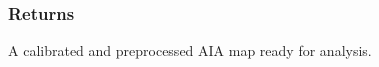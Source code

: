 \documentclass[letterpaper,10pt,english]{sphinxmanual}
\begin{document}
\begin{fulllineitems}
\begin{description}
\end{description}


\subsubsection{Returns}
\label{\detokenize{pycatch/utils/calibration:id2}}\begin{description}
\sphinxAtStartPar
A calibrated and preprocessed AIA map ready for analysis.

\end{description}

\end{fulllineitems}

\end{document}
